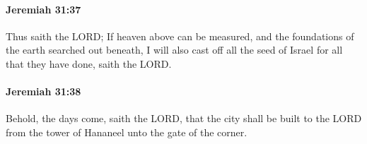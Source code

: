 		\paragraph{Jeremiah 31:37} %
			\label{JEREMIAH-31-37}

			Thus saith the LORD; If heaven above can be measured, and the foundations of the earth searched out beneath, I will also cast off all the seed of Israel for all that they have done, saith the LORD.


		\paragraph{Jeremiah 31:38} %
			\label{JEREMIAH-31-38}

			Behold, the days come, saith the LORD, that the city shall be built to the LORD from the tower of Hananeel unto the gate of the corner.


